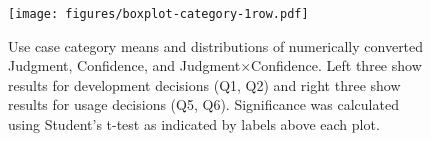 \begin{figure}[!hptb]
    \centering
    \texttt{[image: figures/boxplot-category-1row.pdf]}
    \caption{Use case category means and distributions of numerically converted Judgment, Confidence, and Judgment$\times$Confidence. Left three show results for development decisions (Q1, Q2) and right three show results for usage decisions (Q5, Q6). Significance was calculated using Student's t-test as indicated by labels above each plot.}
    \label{fig:use-case-effect-category}
\end{figure}